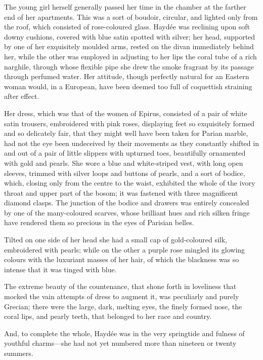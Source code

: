  The young girl herself generally passed her time in the chamber at the farther end of her apartments. This was a sort of boudoir, circular, and lighted only from the roof, which consisted of rose-coloured glass. Haydée was reclining upon soft downy cushions, covered with blue satin spotted with silver; her head, supported by one of her exquisitely moulded arms, rested on the divan immediately behind her, while the other was employed in adjusting to her lips the coral tube of a rich narghile, through whose flexible pipe she drew the smoke fragrant by its passage through perfumed water. Her attitude, though perfectly natural for an Eastern woman would, in a European, have been deemed too full of coquettish straining after effect. 

 Her dress, which was that of the women of Epirus, consisted of a pair of white satin trousers, embroidered with pink roses, displaying feet so exquisitely formed and so delicately fair, that they might well have been taken for Parian marble, had not the eye been undeceived by their movements as they constantly shifted in and out of a pair of little slippers with upturned toes, beautifully ornamented with gold and pearls. She wore a blue and white-striped vest, with long open sleeves, trimmed with silver loops and buttons of pearls, and a sort of bodice, which, closing only from the centre to the waist, exhibited the whole of the ivory throat and upper part of the bosom; it was fastened with three magnificent diamond clasps. The junction of the bodice and drawers was entirely concealed by one of the many-coloured scarves, whose brilliant hues and rich silken fringe have rendered them so precious in the eyes of Parisian belles. 

 Tilted on one side of her head she had a small cap of gold-coloured silk, embroidered with pearls; while on the other a purple rose mingled its glowing colours with the luxuriant masses of her hair, of which the blackness was so intense that it was tinged with blue. 

 The extreme beauty of the countenance, that shone forth in loveliness that mocked the vain attempts of dress to augment it, was peculiarly and purely Grecian; there were the large, dark, melting eyes, the finely formed nose, the coral lips, and pearly teeth, that belonged to her race and country. 

 And, to complete the whole, Haydée was in the very springtide and fulness of youthful charms—she had not yet numbered more than nineteen or twenty summers. 

